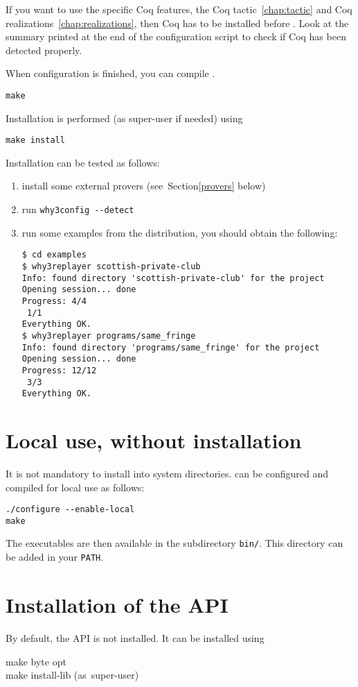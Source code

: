 If you want to use the specific Coq features, \ie the Coq
tactic~\ref{chap:tactic} and Coq realizations~\ref{chap:realizations},
then Coq has to be installed before \why. Look at the summary printed
at the end of the configuration script to check if Coq has been
detected properly.

When configuration is finished, you can compile \why.
\begin{verbatim}
make
\end{verbatim}
Installation is performed (as super-user if needed) using
\begin{verbatim}
make install
\end{verbatim}
Installation can be tested as follows: 
\begin{enumerate}
\item install some external provers (see~Section\ref{provers} below)
\item run \verb|why3config --detect|
\item run some examples from the distribution, \eg you should
obtain the following:
\begin{verbatim}
$ cd examples
$ why3replayer scottish-private-club
Info: found directory 'scottish-private-club' for the project
Opening session... done
Progress: 4/4
 1/1
Everything OK.
$ why3replayer programs/same_fringe
Info: found directory 'programs/same_fringe' for the project
Opening session... done
Progress: 12/12
 3/3
Everything OK.
\end{verbatim}
\end{enumerate}

\section{Local use, without installation}

It is not mandatory to install \why into system directories.
\why can be configured and compiled for local use as follows:
\begin{verbatim}
./configure --enable-local
make
\end{verbatim}
The \why executables are then available in the subdirectory
\texttt{bin/}. This directory can be added in your \texttt{PATH}.

\section{Installation of the \why API}
\label{sec:installlib}

By default, the \why API is not installed. It can be installed using
\begin{flushleft}\ttfamily
make byte opt \\
make install-lib \mbox{\rmfamily (as super-user)}
\end{flushleft}

